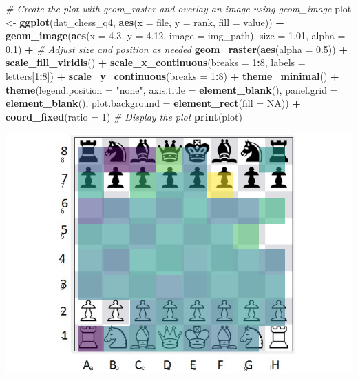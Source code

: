 \documentclass[
]{article}
\newenvironment{Shaded}{\begin{snugshade}}{\end{snugshade}}
\newcommand{\AttributeTok}[1]{\textcolor[rgb]{0.13,0.29,0.53}{#1}}
\newcommand{\CommentTok}[1]{\textcolor[rgb]{0.56,0.35,0.01}{\textit{#1}}}
\newcommand{\ConstantTok}[1]{\textcolor[rgb]{0.56,0.35,0.01}{#1}}
\newcommand{\DecValTok}[1]{\textcolor[rgb]{0.00,0.00,0.81}{#1}}
\newcommand{\FloatTok}[1]{\textcolor[rgb]{0.00,0.00,0.81}{#1}}
\newcommand{\FunctionTok}[1]{\textcolor[rgb]{0.13,0.29,0.53}{\textbf{#1}}}
\newcommand{\NormalTok}[1]{#1}
\newcommand{\OtherTok}[1]{\textcolor[rgb]{0.56,0.35,0.01}{#1}}
\newcommand{\SpecialCharTok}[1]{\textcolor[rgb]{0.81,0.36,0.00}{\textbf{#1}}}
\newcommand{\StringTok}[1]{\textcolor[rgb]{0.31,0.60,0.02}{#1}}
\begin{document}
\begin{Shaded}
\begin{Highlighting}[]
\CommentTok{\# Create the plot with geom\_raster and overlay an image using geom\_image}
\NormalTok{plot }\OtherTok{\textless{}{-}} \FunctionTok{ggplot}\NormalTok{(dat\_chess\_q4, }\FunctionTok{aes}\NormalTok{(}\AttributeTok{x =}\NormalTok{ file, }\AttributeTok{y =}\NormalTok{ rank, }\AttributeTok{fill =}\NormalTok{ value)) }\SpecialCharTok{+}
  \FunctionTok{geom\_image}\NormalTok{(}\FunctionTok{aes}\NormalTok{(}\AttributeTok{x =} \FloatTok{4.3}\NormalTok{, }\AttributeTok{y =} \FloatTok{4.12}\NormalTok{, }\AttributeTok{image =}\NormalTok{ img\_path), }\AttributeTok{size =} \FloatTok{1.01}\NormalTok{, }\AttributeTok{alpha =} \FloatTok{0.1}\NormalTok{) }\SpecialCharTok{+}  \CommentTok{\# Adjust size and position as needed }
  \FunctionTok{geom\_raster}\NormalTok{(}\FunctionTok{aes}\NormalTok{(}\AttributeTok{alpha =} \FloatTok{0.5}\NormalTok{)) }\SpecialCharTok{+} 
  \FunctionTok{scale\_fill\_viridis}\NormalTok{() }\SpecialCharTok{+} 
  \FunctionTok{scale\_x\_continuous}\NormalTok{(}\AttributeTok{breaks =} \DecValTok{1}\SpecialCharTok{:}\DecValTok{8}\NormalTok{, }\AttributeTok{labels =}\NormalTok{ letters[}\DecValTok{1}\SpecialCharTok{:}\DecValTok{8}\NormalTok{]) }\SpecialCharTok{+} 
  \FunctionTok{scale\_y\_continuous}\NormalTok{(}\AttributeTok{breaks =} \DecValTok{1}\SpecialCharTok{:}\DecValTok{8}\NormalTok{) }\SpecialCharTok{+} 
  \FunctionTok{theme\_minimal}\NormalTok{() }\SpecialCharTok{+} 
  \FunctionTok{theme}\NormalTok{(}\AttributeTok{legend.position =} \StringTok{"none"}\NormalTok{,}
        \AttributeTok{axis.title =} \FunctionTok{element\_blank}\NormalTok{(),}
        \AttributeTok{panel.grid =} \FunctionTok{element\_blank}\NormalTok{(),}
        \AttributeTok{plot.background =} \FunctionTok{element\_rect}\NormalTok{(}\AttributeTok{fill =} \ConstantTok{NA}\NormalTok{)) }\SpecialCharTok{+}
  \FunctionTok{coord\_fixed}\NormalTok{(}\AttributeTok{ratio =} \DecValTok{1}\NormalTok{) }
\CommentTok{\# Display the plot}
\FunctionTok{print}\NormalTok{(plot)}
\end{Highlighting}
\end{Shaded}

\includegraphics{STAT842_Assignment2_files/figure-latex/unnamed-chunk-6-1.pdf}
\end{document}
